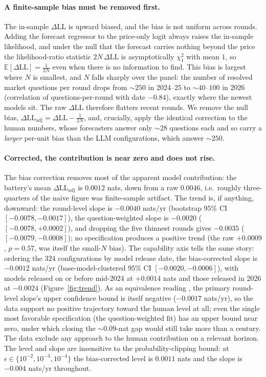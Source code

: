 \documentclass[11pt]{article}
\begin{document}
\paragraph{A finite-sample bias must be removed first.} The in-sample $\Delta$LL is upward biased, and the bias is not uniform across rounds. Adding the forecast regressor to the price-only logit always raises the in-sample likelihood, and under the null that the forecast carries nothing beyond the price the likelihood-ratio statistic $2N\,\Delta\mathrm{LL}$ is asymptotically $\chi^2_1$ with mean $1$, so $\mathbb{E}[\Delta\mathrm{LL}]=\tfrac{1}{2N}$ even when there is no information to find. This bias is largest where $N$ is smallest, and $N$ falls sharply over the panel: the number of resolved market questions per round drops from $\sim\!250$ in 2024--25 to $\sim\!40$--$100$ in 2026 (correlation of questions-per-round with date $-0.84$), exactly where the newest models sit. The raw $\Delta\mathrm{LL}$ therefore flatters recent rounds. We remove the null bias, $\Delta\mathrm{LL}_{\mathrm{adj}} = \Delta\mathrm{LL} - \tfrac{1}{2N}$, and, crucially, apply the identical correction to the human numbers, whose forecasters answer only $\sim\!28$ questions each and so carry a \emph{larger} per-unit bias than the LLM configurations, which answer $\sim\!250$.

\paragraph{Corrected, the contribution is near zero and does not rise.} The bias correction removes most of the apparent model contribution: the battery's mean $\Delta\mathrm{LL}_{\mathrm{adj}}$ is $0.0012$ nats, down from a raw $0.0046$, i.e.\ roughly three-quarters of the naive figure was finite-sample artifact. The trend is, if anything, downward: the round-level slope is $-0.0040$ nats/yr (bootstrap $95\%$ CI $[-0.0078,-0.0017]$), the question-weighted slope is $-0.0020$ ($[-0.0078,+0.0002]$), and dropping the five thinnest rounds gives $-0.0035$ ($[-0.0079,-0.0008]$); no specification produces a positive trend (the raw $+0.0009$, $p=0.57$, was itself the small-$N$ bias). The capability axis tells the same story: ordering the $324$ configurations by model release date, the bias-corrected slope is $-0.0012$ nats/yr (base-model-clustered $95\%$ CI $[-0.0020,-0.0006]$), with models released on or before mid-2024 at $+0.0014$ nats and those released in 2026 at $-0.0024$ (Figure~\ref{fig:trend}). As an equivalence reading \citep{lakens2017}, the primary round-level slope's upper confidence bound is itself negative ($-0.0017$ nats/yr), so the data support no positive trajectory toward the human level at all; even the single most favorable specification (the question-weighted fit) has an upper bound near zero, under which closing the $\sim\!0.09$-nat gap would still take more than a century. The data exclude any approach to the human contribution on a relevant horizon. The level and slope are insensitive to the probability-clipping bound: at $\epsilon\in\{10^{-2},10^{-3},10^{-4}\}$ the bias-corrected level is $0.0011$ nats and the slope is $-0.004$ nats/yr throughout.
\end{document}
